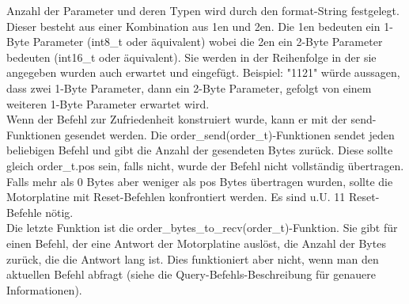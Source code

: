 \documentclass[a4paper]{article}
\begin{document}
	Anzahl der Parameter und deren Typen wird durch den format-String festgelegt. Dieser besteht aus einer Kombination
	aus 1en und 2en. Die 1en bedeuten ein 1-Byte Parameter (int8\_t oder äquivalent) wobei die 2en ein 2-Byte
	Parameter bedeuten (int16\_t oder äquivalent). Sie werden in der Reihenfolge in der sie angegeben wurden auch erwartet
	und eingefügt. Beispiel: "1121" würde aussagen, dass zwei 1-Byte Parameter, dann ein 2-Byte Parameter, gefolgt von
	einem weiteren 1-Byte Parameter erwartet wird.\\
	Wenn der Befehl zur Zufriedenheit konstruiert wurde, kann er mit der send-Funktionen gesendet werden.
	Die order\_send(order\_t)-Funktionen sendet jeden beliebigen Befehl und gibt die Anzahl der gesendeten
	Bytes zurück. Diese sollte gleich order\_t.pos sein, falls nicht, wurde der Befehl nicht vollständig
	übertragen. Falls mehr als 0 Bytes aber weniger als pos Bytes übertragen wurden, sollte die Motorplatine
	mit Reset-Befehlen konfrontiert werden. Es sind u.U. 11 Reset-Befehle nötig.\\
	Die letzte Funktion ist die order\_bytes\_to\_recv(order\_t)-Funktion. Sie gibt für einen Befehl, der eine
	Antwort der Motorplatine auslöst, die Anzahl der Bytes zurück, die die Antwort lang ist. Dies funktioniert
	aber nicht, wenn man den aktuellen Befehl abfragt (siehe die Query-Befehls-Beschreibung für genauere
	Informationen).
\end{document}
